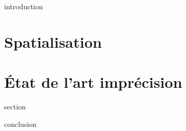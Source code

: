 
\chaptertoc{}

\label{sec:3-int}
{introduction}

\section{Spatialisation}
\label{sec:3-1}

\section{État de l'art imprécision}
\label{sec:3-2}
{section}


\label{sec:3-cnc}
{conclusion}

